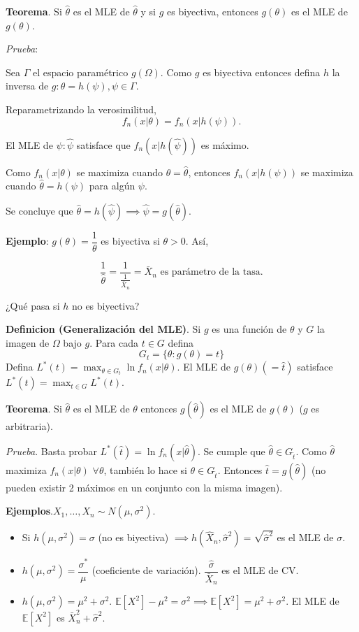 \documentclass[
  12pt,
]{book}
\begin{document}
\textbf{Teorema}. Si \(\hat\theta\) es el MLE de \(\hat\theta\) y si \(g\) es biyectiva,
entonces \(g(\theta)\) es el MLE de \(g(\theta)\).

\emph{Prueba}:

Sea \(\Gamma\) el espacio paramétrico \(g(\Omega)\). Como \(g\) es biyectiva entonces
defina \(h\) la inversa de \(g\colon \theta = h(\psi), \psi \in \Gamma\).

Reparametrizando la verosimilitud,
\[f_n(x|\theta) = f_n(x|h(\psi)). \]

El MLE de \(\psi:\hat\psi\) satisface que \(f_n(x|h(\hat\psi))\) es máximo.

Como \(f_n(x|\theta)\) se maximiza cuando \(\theta = \hat \theta\), entonces \(f_n(x|h(\psi))\) se
maximiza cuando \(\hat \theta = h(\psi)\) para algún \(\psi\).

Se concluye que \(\hat\theta = h(\hat\psi) \implies \hat\psi = g(\hat \theta)\).

\textbf{Ejemplo}: \(g(\theta) = \dfrac 1\theta\) es biyectiva si \(\theta > 0\). Así,

\begin{equation*} 
\frac{1}{\hat{\theta}} = \frac{1}{\frac{1}{\bar{X}_n}} =
\bar{X}_n \text{ es parámetro de la tasa.} 
\end{equation*}

¿Qué pasa si \(h\) no es biyectiva?

\textbf{Definicion (Generalización del MLE)}. Si \(g\) es una función de \(\theta\) y \(G\)
la imagen de \(\Omega\) bajo \(g\). Para cada \(t\in G\)
defina \[ G_t = \{\theta: g(\theta) = t\}\] Defina
\(L^*(t) = \displaystyle\max_{\theta\in G_t} \ln f_n(x|\theta)\). El MLE de \(g(\theta) (=\hat t)\)
satisface \(L^*(\hat t) = \displaystyle\max_{t \in G} L^*(t)\).

\textbf{Teorema}. Si \(\hat \theta\) es el MLE de \(\theta\) entonces \(g(\hat\theta)\) es el
MLE de \(g(\theta)\) (\(g\) es arbitraria).

\emph{Prueba}. Basta probar \(L^*(\hat t) = \ln f_n(x|\hat \theta)\). Se cumple que
\(\hat\theta\in G_{\hat t}\). Como \(\hat \theta\) maximiza \(f_n(x|\theta)\) \(\forall \theta\), también
lo hace si \(\theta \in G_{\hat t}\). Entonces \(\hat t = g(\hat \theta)\) (no pueden existir 2
máximos en un conjunto con la misma imagen).

\textbf{Ejemplos}.\(X_1,\dots, X_n \sim N(\mu, \sigma^2)\).

\begin{itemize}
\item
  Si \(h(\mu, \sigma^2) = \sigma\) (no es biyectiva) \(\implies h(\hat X_n,\hat\sigma^2) = \sqrt{\hat\sigma^2}\) es el MLE de \(\sigma\).
\item
  \(h(\mu,\sigma^2) = \dfrac{\sigma^*}{\mu}\) (coeficiente de variación). \(\dfrac{\hat{\sigma}}{\bar X_n}\) es el MLE de CV.
\item
  \(h(\mu, \sigma^2) = \mu^2 + \sigma^2\). \(\mathbb{E}[X^2] - \mu^2 = \sigma^2 \implies \mathbb{E}[X^2] = \mu^2 + \sigma^2\). El MLE de \(\mathbb{E}[X^2]\) es \(\bar X_n^2 + \hat \sigma ^2\).
\end{itemize}
\end{document}
